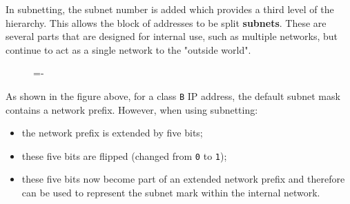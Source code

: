 \documentclass[a4paper]{systems-software}
\begin{document}
In subnetting, the subnet number is added which provides a third level of the hierarchy. This allows the block of addresses to be split \textbf{subnets}. These are several parts that are designed for internal use, such as multiple networks, but continue to act as a single network to the "outside world".

\begin{figure}[H]
	\lineskip=-\fboxrule
\end{figure}

As shown in the figure above, for a class \texttt{B} IP address, the default subnet mask contains a network prefix. However, when using subnetting:
\begin{itemize}
	\item the network prefix is extended by five bits;
	\item these five bits are flipped (changed from \texttt{0} to \texttt{1});
	\item these five bits now become part of an extended network prefix and therefore can be used to represent the subnet mark within the internal network.
\end{itemize}

\newpage
\end{document}
